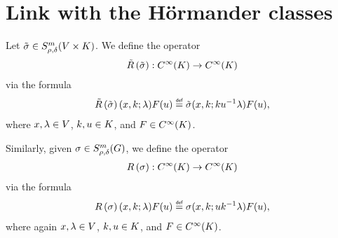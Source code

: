 \section{Link with the H\"ormander classes}

\begin{definition}
    Let $\tilde \sigma \in \SymbolClass[\GroupDirect]{m}{\rho, \delta}$.
    We define the operator
    \begin{align*}
        \Rotation {\tilde \sigma} : \SmoothFunctions \CompactGroup \to \SmoothFunctions \CompactGroup
    \end{align*}
    via the formula
    \begin{align*}
        \Rotation {\tilde \sigma}(x, k; \lambda) F(u) \defeq \tilde \sigma(x, k; k u^{-1} \lambda) F(u),
    \end{align*}
    where $x, \lambda \in \VectorSpace$, $k, u \in \CompactGroup$, and $F \in \SmoothFunctions \CompactGroup$.

    Similarly, given $\sigma \in \SymbolClass m {\rho, \delta}$,
    we define the operator
    \begin{align*}
        \InverseRotation \sigma : \SmoothFunctions \CompactGroup \to \SmoothFunctions \CompactGroup
    \end{align*}
    via the formula
    \begin{align*}
        \InverseRotation \sigma (x, k; \lambda) F(u) \defeq \sigma(x, k; u k^{-1} \lambda) F(u),
    \end{align*}
    where again $x, \lambda \in \VectorSpace$, $k, u \in \CompactGroup$, and $F \in \SmoothFunctions \CompactGroup$.
\end{definition}

